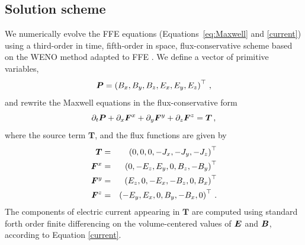 \subsection{Solution scheme}
\label{scheme}
%
We numerically evolve the FFE equations (Equations~\ref{eq:Maxwell} and \ref{current}) using a third-order in time, fifth-order in space, flux-conservative scheme based on the WENO method \citep{doi:10.1137/070679065} adapted to FFE \citep{2011MNRAS.411.2461Y}.
We define a vector of primitive variables,
%
\begin{equation}
	\boldsymbol{P}= \left(B_x,B_y,B_z, E_x,E_y,E_z\right)^\top \, ,
\end{equation}
%
and rewrite the Maxwell equations in the flux-conservative form
%
\begin{equation} \label{maxwell-fv}
	\partial_t \boldsymbol{P} + \partial_x\boldsymbol{F}^x + \partial_y\boldsymbol{F}^y + \partial_z\boldsymbol{F}^z = \boldsymbol{T} \, ,
\end{equation}
%
where the source term $\boldsymbol{T}$, and the flux functions are given by
%
\begin{eqnarray}
	\boldsymbol{T} &=& \left(0,0,0, -J_x, -J_y, -J_z\right)^\top \nonumber\\
	\boldsymbol{F}^x &=& \left(0,-E_z,E_y,0,B_z,-B_y\right)^\top \nonumber\\
	\boldsymbol{F}^y &=& \left(E_z,0,-E_x,-B_z,0,B_x\right)^\top \nonumber\\
	\boldsymbol{F}^z &=& \left(-E_y,E_x,0, B_y,-B_x,0 \right)^\top \, .
\end{eqnarray}
The components of electric current appearing in $\boldsymbol{T}$ are computed using standard forth order finite differencing on the volume-centered values of $\boldsymbol{E}$ and $\boldsymbol{B}$, according to Equation \ref{current}.

